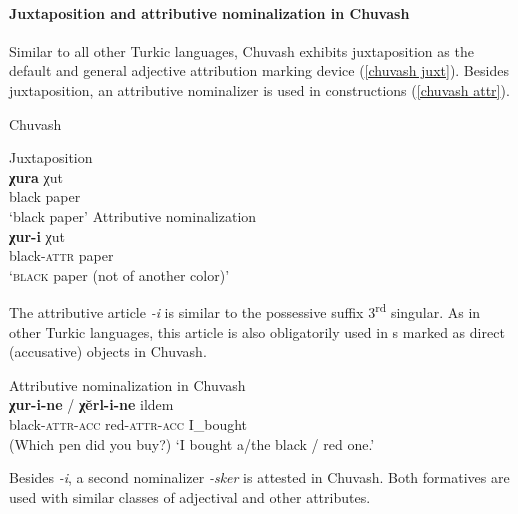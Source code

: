 \paragraph*{Juxtaposition and attributive nominalization in Chuvash}
\label{chuvash synchr}
Similar to all other Turkic languages, Chuvash exhibits juxtaposition as the default and general adjective attribution marking device (\ref{chuvash juxt}). Besides juxtaposition, an attributive nominalizer is used in  constructions (\ref{chuvash attr}).
\begin{exe}
\ex	
\rm{Chuvash \citep{clark1998a}}
\begin{xlist}
\ex 	
\label{chuvash juxt}
\rm{Juxtaposition}\\
\gll	\textbf{χura} χut\\
	black paper\\
\glt	‘black paper’
\ex	
\label{chuvash attr}
\rm{Attributive nominalization}\\
\gll	\textbf{χur-i} χut\\					 		
	black-\textsc{attr} paper\\
\glt	‘\textsc{black} paper (not of another color)’
\end{xlist}
\end{exe}
The attributive article \textit{-i} is similar to the possessive suffix 3\textsuperscript{rd} singular. As in other Turkic languages, this article is also obligatorily used in s marked as direct (accusative) objects in Chuvash.
\begin{exe}
\ex 
\label{chuvash headless acc}	
\rm{Attributive nominalization in Chuvash \citep[7]{benzing1993b}}\\
\gll	\textbf{χur-i-ne} / \textbf{χĕrl-i-ne} ildem\\
 	black-\textsc{attr}-\textsc{acc} { } red-\textsc{attr}-\textsc{acc} I\_bought\\
\glt 	(Which pen did you buy?) ‘I bought a/the black / red one.’
\end{exe}
Besides \textit{-i}, a second nominalizer \textit{-sker} is attested in Chuvash. Both formatives are used with similar classes of adjectival and other attributes.
